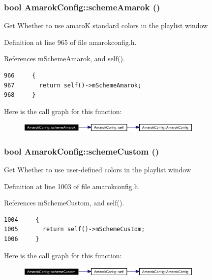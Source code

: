 \subsubsection{\setlength{\rightskip}{0pt plus 5cm}bool Amarok\-Config::scheme\-Amarok ()\hspace{0.3cm}{\tt  [inline, static]}}\label{classAmarokConfig_AmarokConfige100}


Get Whether to use amaro\-K standard colors in the playlist window 

Definition at line 965 of file amarokconfig.h.

References m\-Scheme\-Amarok, and self().



\footnotesize\begin{verbatim}966     {
967       return self()->mSchemeAmarok;
968     }
\end{verbatim}\normalsize 


Here is the call graph for this function:\begin{figure}[H]
\begin{center}
\leavevmode
\includegraphics[width=258pt]{classAmarokConfig_AmarokConfige100_cgraph}
\end{center}
\end{figure}
\subsubsection{\setlength{\rightskip}{0pt plus 5cm}bool Amarok\-Config::scheme\-Custom ()\hspace{0.3cm}{\tt  [inline, static]}}\label{classAmarokConfig_AmarokConfige104}


Get Whether to use user-defined colors in the playlist window 

Definition at line 1003 of file amarokconfig.h.

References m\-Scheme\-Custom, and self().



\footnotesize\begin{verbatim}1004     {
1005       return self()->mSchemeCustom;
1006     }
\end{verbatim}\normalsize 


Here is the call graph for this function:\begin{figure}[H]
\begin{center}
\leavevmode
\includegraphics[width=258pt]{classAmarokConfig_AmarokConfige104_cgraph}
\end{center}
\end{figure}

